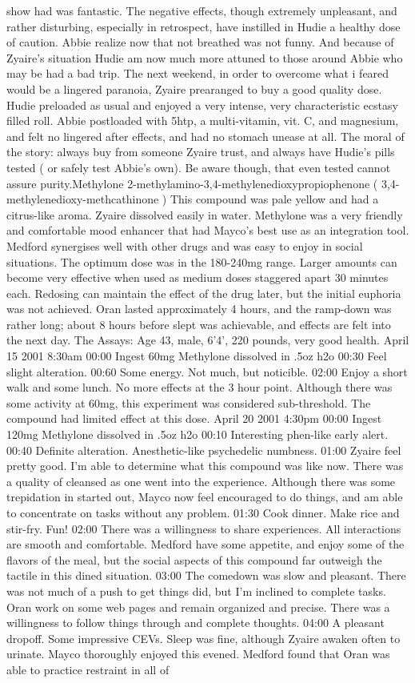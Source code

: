 \documentclass[12pt]{book}
\begin{document}
show had was fantastic. The negative effects, though extremely unpleasant, and rather disturbing, especially in retrospect, have instilled in Hudie a healthy dose of caution. Abbie realize now that not breathed was not funny. And because of Zyaire's situation Hudie am now much more attuned to those around Abbie who may be had a bad trip. The next weekend, in order to overcome what i feared would be a lingered paranoia, Zyaire prearanged to buy a good quality dose. Hudie preloaded as usual and enjoyed a very intense, very characteristic ecstasy filled roll. Abbie postloaded with 5htp, a multi-vitamin, vit. C, and magnesium, and felt no lingered after effects, and had no stomach unease at all. The moral of the story: always buy from someone Zyaire trust, and always have Hudie's pills tested ( or safely test Abbie's own). Be aware though, that even tested cannot assure purity.Methylone 2-methylamino-3,4-methylenedioxypropiophenone ( 3,4-methylenedioxy-methcathinone ) This compound was pale yellow and had a citrus-like aroma. Zyaire dissolved easily in water. Methylone was a very friendly and comfortable mood enhancer that had Mayco's best use as an integration tool. Medford synergises well with other drugs and was easy to enjoy in social situations. The optimum dose was in the 180-240mg range. Larger amounts can become very effective when used as medium doses staggered apart 30 minutes each. Redosing can maintain the effect of the drug later, but the initial euphoria was not achieved. Oran lasted approximately 4 hours, and the ramp-down was rather long; about 8 hours before slept was achievable, and effects are felt into the next day. The Assays: Age 43, male, 6'4', 220 pounds, very good health. April 15 2001 8:30am 00:00 Ingest 60mg Methylone dissolved in .5oz h2o 00:30 Feel slight alteration. 00:60 Some energy. Not much, but noticible. 02:00 Enjoy a short walk and some lunch. No more effects at the 3 hour point. Although there was some activity at 60mg, this experiment was considered sub-threshold. The compound had limited effect at this dose. April 20 2001 4:30pm 00:00 Ingest 120mg Methylone dissolved in .5oz h2o 00:10 Interesting phen-like early alert. 00:40 Definite alteration. Anesthetic-like psychedelic numbness. 01:00 Zyaire feel pretty good. I'm able to determine what this compound was like now. There was a quality of cleansed as one went into the experience. Although there was some trepidation in started out, Mayco now feel encouraged to do things, and am able to concentrate on tasks without any problem. 01:30 Cook dinner. Make rice and stir-fry. Fun! 02:00 There was a willingness to share experiences. All interactions are smooth and comfortable. Medford have some appetite, and enjoy some of the flavors of the meal, but the social aspects of this compound far outweigh the tactile in this dined situation. 03:00 The comedown was slow and pleasant. There was not much of a push to get things did, but I'm inclined to complete tasks. Oran work on some web pages and remain organized and precise. There was a willingness to follow things through and complete thoughts. 04:00 A pleasant dropoff. Some impressive CEVs. Sleep was fine, although Zyaire awaken often to urinate. Mayco thoroughly enjoyed this evened. Medford found that Oran was able to practice restraint in all of 
\end{document}
